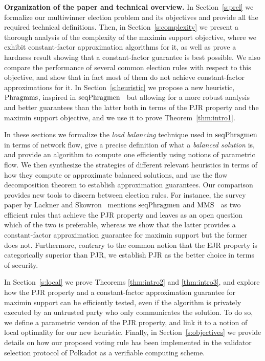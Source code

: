 
\textbf{Organization of the paper and technical overview.}
In Section~\ref{s:prel} we formalize our multiwinner election problem and its objectives and provide all the required technical definitions. Then, in Section~\ref{s:complexity} we present a thorough analysis of the complexity of the maximin support objective, where we exhibit constant-factor approximation algorithms for it, as well as prove a hardness result showing that a constant-factor guarantee is best possible. 
We also compare the performance of several common election rules with respect to this objective, and show that in fact most of them do not achieve constant-factor approximations for it.
In Section~\ref{s:heuristic} we propose a new heuristic, $\operatorname{Phragmms}$, inspired in $\operatorname{seqPhragmen}$~\cite{brill2017phragmen} but allowing for a more robust analysis and better guarantees than the latter both in terms of the PJR property and the maximin support objective, and we use it to prove Theorem~\ref{thm:intro1}. 

In these sections we formalize the \emph{load balancing} technique used in $\operatorname{seqPhragmen}$ in terms of network flow, give a precise definition of what a \emph{balanced solution} is, and provide an algorithm to compute one efficiently using notions of parametric flow. 
We then synthesize the strategies of different relevant heuristics in terms of how they compute or approximate balanced solutions, and use the flow decomposition theorem to establish approximation guarantees. 
Our comparison provides new tools to discern between election rules. For instance, the survey paper by Lackner and Skowron~\cite{lackner2020approval} mentions $\operatorname{seqPhragmen}$ and $\operatorname{MMS}$~\cite{sanchez2016maximin} as two efficient rules that achieve the PJR property and leaves as an open question which of the two is preferable, whereas we show that the latter provides a constant-factor approximation guarantee for maximin support but the former does not. 
Furthermore, contrary to the common notion that the EJR property is categorically superior than PJR, we establish PJR as the better choice in terms of security.

In Section~\ref{s:local} we prove Theorems \ref{thm:intro2} and \ref{thm:intro3}, and explore how the PJR property and a constant-factor approximation guarantee for maximin support can be efficiently tested, even if the algorithm is privately executed by an untrusted party who only communicates the solution. 
To do so, we define a parametric version of the PJR property, and link it to a notion of local optimality for our new heuristic. Finally, in Section~\ref{s:objectives} we provide details on how our proposed voting rule has been implemented in the validator selection protocol of Polkadot as a verifiable computing scheme.
